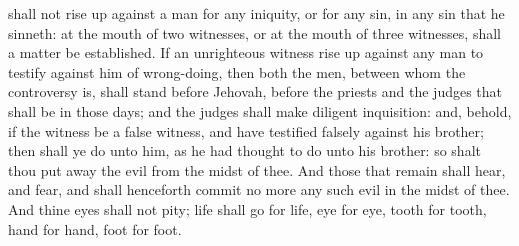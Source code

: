 shall not rise up against a man for any iniquity, or for any sin, in any sin that he sinneth: at the mouth of two witnesses, or at the mouth of three witnesses, shall a matter be established. If an unrighteous witness rise up against any man to testify against him of wrong-doing, then both the men, between whom the controversy is, shall stand before Jehovah, before the priests and the judges that shall be in those days; and the judges shall make diligent inquisition: and, behold, if the witness be a false witness, and have testified falsely against his brother; then shall ye do unto him, as he had thought to do unto his brother: so shalt thou put away the evil from the midst of thee. And those that remain shall hear, and fear, and shall henceforth commit no more any such evil in the midst of thee. And thine eyes shall not pity; life shall go for life, eye for eye, tooth for tooth, hand for hand, foot for foot. 

